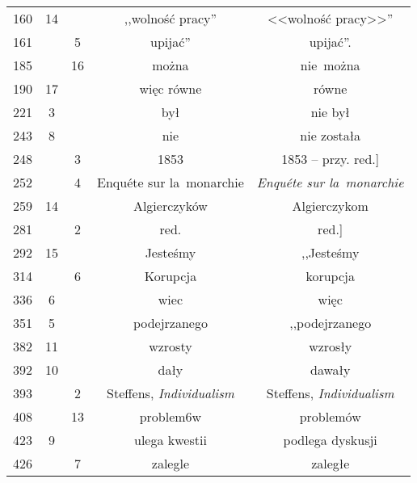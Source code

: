 \documentclass[a4paper,11pt]{article}
\begin{document}
\begin{center}
\begin{tabular}{|c|c|c|c|c|}
    160 & 14 & & ,,wolność pracy'' & <<wolność pracy>>'' \\
    161 & &  5 & upijać'' & upijać''. \\
    185 & & 16 & można & nie~można \\
    190 & 17 & & więc równe & równe \\
    221 &  3 & & był & nie był \\
    243 &  8 & & nie & nie została \\
    248 & &  3 & 1853 & 1853 -- przy. red.] \\
    252 & &  4 & Enqu\'{e}te sur la~monarchie
           & \emph{Enqu\'{e}te sur la~monarchie} \\
    259 & 14 & & Algierczyków & Algierczykom \\
    281 & &  2 & red. & red.] \\
    292 & 15 & & Jesteśmy & ,,Jesteśmy  %
    \\
    314 & &  6 & Korupcja & korupcja \\
    336 &  6 & & wiec & więc \\
    351 &  5 & & podejrzanego & ,,podejrzanego  %
    \\
    382 & 11 & & wzrosty & wzrosły \\
    392 & 10 & & dały & dawały \\
    393 & &  2 & Steffens,{ }{ }\emph{Individualism}
           & Steffens, \emph{Individualism} \\
    408 & & 13 & problem6w & problemów \\
    423 &  9 & & ulega kwestii & podlega dyskusji \\
    426 & &  7 & zalegle & zaległe \\
    \hline
  \end{tabular}
\end{center}
\end{document}
